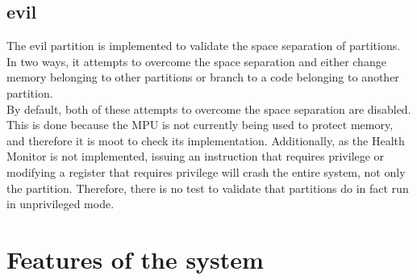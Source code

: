 \subsection{evil}
The evil partition is implemented to validate the space separation of partitions.
In two ways, it attempts to overcome the space separation and either change
memory belonging to other partitions or branch to a code belonging to another
partition.\\
By default, both of these attempts to overcome the space separation are disabled.
This is done because the MPU is not currently being used to protect memory, and
therefore it is moot to check its implementation. Additionally, as the Health
Monitor is not implemented, issuing an instruction that requires privilege
or modifying a register that requires privilege will crash the entire system,
not only the partition. Therefore, there is no test to validate that partitions
do in fact run in unprivileged mode.

\section{Features of the system}
